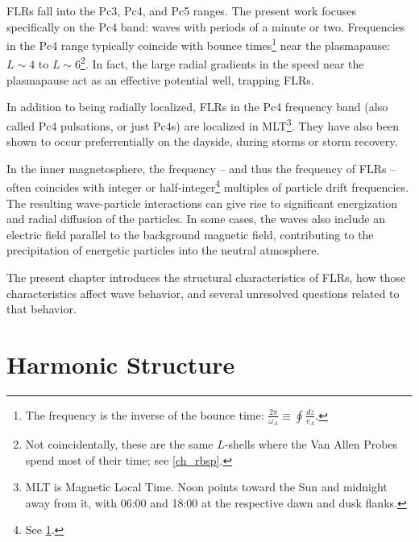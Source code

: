 FLRs fall into the Pc3, Pc4, and Pc5 ranges. The present work focuses specifically on the Pc4 band: waves with periods of a minute or two. Frequencies in the Pc4 range typically coincide with \Alfven bounce times\footnote{The \Alfven frequency is the inverse of the \Alfven bounce time: $\frac{2 \pi}{\omega_A} \equiv \oint \frac{dz}{v_A}$. } near the plasmapause: $L\sim4$ to $L\sim6$\cite{anderson_1990,dai_2015,engebretson_1992,liu_2009}\footnote{Not coincidentally, these are the same $L$-shells where the Van Allen Probes spend most of their time; see \cref{ch_rbsp}. }. In fact, the large radial gradients in the \Alfven speed near the plasmapause act as an effective potential well, trapping FLRs\cite{dai_2009,klimushkin_2004,lee_1999,leonovich_2000,mager_2013,takahashi_2010}. 

In addition to being radially localized, FLRs in the Pc4 frequency band (also called Pc4 pulsations, or just Pc4s) are localized in MLT\footnote{MLT is Magnetic Local Time. Noon points toward the Sun and midnight away from it, with 06:00 and 18:00 at the respective dawn and dusk flanks. }. They have also been shown to occur preferrentially on the dayside, during storms or storm recovery\cite{anderson_1990,dai_2015,engebretson_1992,kokubun_1989,liu_2009,ukhorskiy_2005}. 

In the inner magnetosphere, the \Alfven frequency -- and thus the frequency of FLRs -- often coincides with integer or half-integer\footnote{See \cref{sec_harmonics}. } multiples of particle drift frequencies\cite{dai_2013}. The resulting wave-particle interactions can give rise to significant energization and radial diffusion of the particles. In some cases, the waves also include an electric field parallel to the background magnetic field, contributing to the precipitation of energetic particles into the neutral atmosphere\cite{goertz_1979,goertz_1984,thompson_1996,wygant_2002}. 

The present chapter introduces the structural characteristics of FLRs, how those characteristics affect wave behavior, and several unresolved questions related to that behavior. 

\section{Harmonic Structure}
  \label{sec_harmonics}

